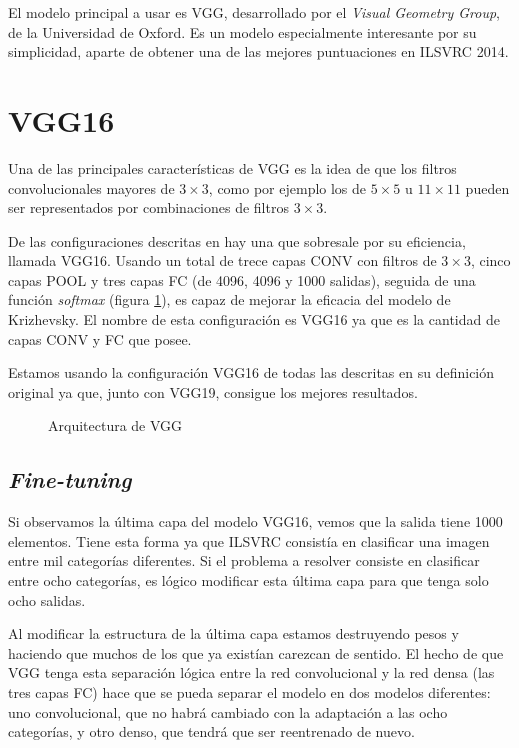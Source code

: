 El modelo principal a usar es VGG, desarrollado por el \textit{Visual Geometry Group}, de la Universidad de Oxford. Es un modelo especialmente interesante por su simplicidad, aparte de obtener una de las mejores puntuaciones en ILSVRC 2014.

\section{VGG16}

Una de las principales características de VGG es la idea de que los filtros convolucionales mayores de $3\times3$, como por ejemplo los de $5\times5$ u $11\times11$ pueden ser representados por combinaciones de filtros $3\times3$.

De las configuraciones descritas en \parencite{simonyan} hay una que sobresale por su eficiencia, llamada VGG16. Usando un total de trece capas CONV con filtros de $3\times3$, cinco capas POOL y tres capas FC (de 4096, 4096 y 1000 salidas), seguida de una función \textit{softmax} (figura \ref{vgg16-arch}), es capaz de mejorar la eficacia del modelo de Krizhevsky. El nombre de esta configuración es VGG16 ya que es la cantidad de capas CONV y FC que posee.

Estamos usando la configuración VGG16 de todas las descritas en su definición original ya que, junto con VGG19, consigue los mejores resultados.

\begin{figure}
  \caption{Arquitectura de VGG}
\label{vgg16-arch}
\end{figure}

\subsection{\textit{Fine-tuning}}

Si observamos la última capa del modelo VGG16, vemos que la salida tiene 1000 elementos. Tiene esta forma ya que ILSVRC consistía en clasificar una imagen entre mil categorías diferentes. Si el problema a resolver consiste en clasificar entre ocho categorías, es lógico modificar esta última capa para que tenga solo ocho salidas.

Al modificar la estructura de la última capa estamos destruyendo pesos y haciendo que muchos de los que ya existían carezcan de sentido. El hecho de que VGG tenga esta separación lógica entre la red convolucional y la red densa (las tres capas FC) hace que se pueda separar el modelo en dos modelos diferentes: uno convolucional, que no habrá cambiado con la adaptación a las ocho categorías, y otro denso, que tendrá que ser reentrenado de nuevo.

